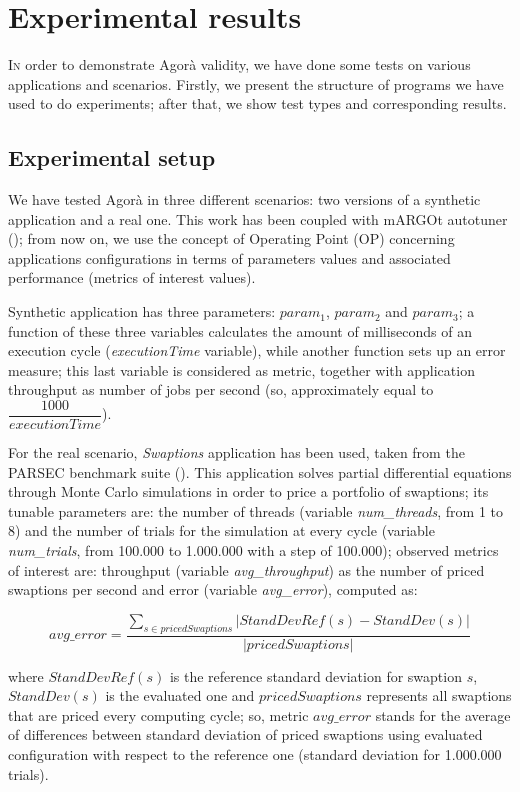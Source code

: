\chapter{Experimental results}\label{exps}

\lettrine{I}{n} order to demonstrate Agorà validity, we have done some tests on various applications and scenarios. Firstly, we present the structure of programs we have used to do experiments; after that, we show test types and corresponding results.

\section{Experimental setup}\label{expSetup}

We have tested Agorà in three different scenarios: two versions of a synthetic application and a real one. This work has been coupled with mARGOt autotuner (\cite{gadioli2015application}); from now on, we use the concept of Operating Point (OP) concerning applications configurations in terms of parameters values and associated performance (metrics of interest values).

Synthetic application has three parameters: $param_1$, $param_2$ and $param_3$; a function of these three variables calculates the amount of milliseconds of an execution cycle (\textit{executionTime} variable), while another function sets up an error measure; this last variable is considered as metric, together with application throughput as number of jobs per second (so, approximately equal to $\dfrac{1000}{\textit{executionTime}}$).

For the real scenario, \textit{Swaptions} application has been used, taken from the PARSEC benchmark suite (\cite{bienia2008parsec}). This application solves partial differential equations through Monte Carlo simulations in order to price a portfolio of swaptions; its tunable parameters are: the number of threads (variable \textit{num\_threads}, from 1 to 8) and the number of trials for the simulation at every cycle (variable \textit{num\_trials}, from 100.000 to 1.000.000 with a step of 100.000); observed metrics of interest are: throughput (variable \textit{avg\_throughput}) as the number of priced swaptions per second and error (variable \textit{avg\_error}), computed as:

\[
avg\_error = \dfrac{\sum_{s \in pricedSwaptions} \left\vert StandDevRef(s) - StandDev(s) \right\vert}{\left\vert pricedSwaptions \right\vert}
\]

where $StandDevRef(s)$ is the reference standard deviation for swaption $s$, $StandDev(s)$ is the evaluated one and $pricedSwaptions$ represents all swaptions that are priced every computing cycle; so, metric $avg\_error$ stands for the average of differences between standard deviation of priced swaptions using evaluated configuration with respect to the reference one (standard deviation for 1.000.000 trials).

